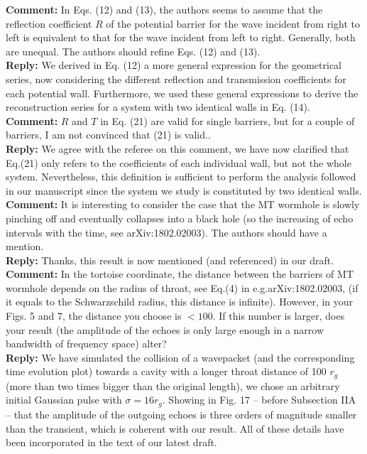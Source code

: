 \documentclass[preprintnumbers,floats,floatfix,amssymb,prd,onecolumn,superscriptaddress,nofootinbib]{revtex4}
\begin{document}
\textbf{Comment:} In Eqs. (12) and (13), the authors seems to assume that the reflection coefficient $R$ of the potential barrier for the wave incident from right to left is equivalent to that for the wave incident from left to right. Generally, both are unequal. The authors should refine Eqs. (12) and (13).\\

\textbf{Reply:} We derived in Eq. (12) a more general expression for the geometrical series, now considering the different reflection and transmission coefficients for each potential wall. Furthermore, we used these general expressions to derive the reconstruction series for a system with two identical walls in Eq. (14).\\
 
\textbf{Comment:} $R$ and $T$ in Eq. (21) are valid for single barriers, but for a couple of barriers, I am not convinced that (21) is valid..\\  
  
\textbf{Reply:} We agree with the referee on this comment, we have now clarified that Eq.(21) only refers to the coefficients of each individual wall, but not the whole system. Nevertheless, this definition is sufficient to perform the analysis followed in our manuscript since the system we study is constituted by two identical walls.\\

\textbf{Comment:} It is interesting to consider the case that the MT wormhole is slowly pinching off and eventually collapses into a black hole (so the increasing of echo intervals with the time, see arXiv:1802.02003). The authors should have a mention.   \\

\textbf{Reply:} Thanks, this result is now mentioned (and referenced) in our draft.\\

\textbf{Comment:} In the tortoise coordinate, the distance between the barriers of MT wormhole depends on the radius of throat, see Eq.(4) in e.g.arXiv:1802.02003, (if it equals to the 
Schwarzschild radius, this distance is infinite). However, in your Figs. 5 and 7, the distance you choose is $<100$. If this number is larger, does your result (the amplitude of the echoes is only large enough in a narrow bandwidth of frequency space) alter?\\

\textbf{Reply:}  We have simulated the collision of a wavepacket (and the corresponding time evolution plot) towards a cavity with a longer throat distance of 100 $r_g$ (more than two times bigger than the original length), we chose an arbitrary initial Gaussian pulse with $\sigma=16r_g$. Showing in Fig. 17 -- before Subsection IIA -- that the amplitude of the outgoing echoes is three orders of magnitude smaller than the transient, which is coherent with our result. All of these details have been incorporated in the text of our latest draft.\\
\end{document}
